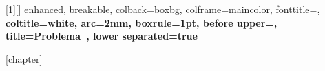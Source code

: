 [1][]{
  enhanced,
  breakable,
  colback=boxbg,
  colframe=maincolor,
  fonttitle=\bfseries,
  coltitle=white,
  arc=2mm,
  boxrule=1pt,
  before upper={},
  title={Problema~\theproblemacontador{}},
  lower separated=true
}


[chapter]

\newenvironment{ejemplo}[1][]{%
  \refstepcounter{ejemplocontador}%
  \begin{tcolorbox}[
    enhanced,
    breakable,
    colback=boxbg,
    colframe=examplecolor,
    fonttitle=\bfseries\itshape,
    coltitle=white,
    arc=1mm,
    boxrule=0.75pt,
    title={Ejemplo~\theejemplocontador\ifstrempty{#1}{}{: #1}}
  ]%
}{%
  \end{tcolorbox}%
}

